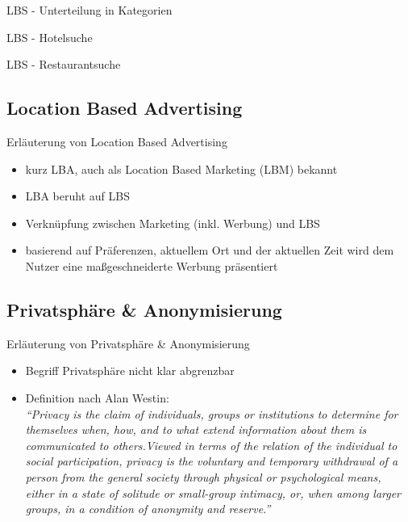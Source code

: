 \begin{frame}{LBS - Unterteilung in Kategorien}
  \begin{center}
  \end{center}
\end{frame}

\begin{frame}{LBS - Hotelsuche}
  \begin{center}
  \end{center}
\end{frame}

\begin{frame}{LBS - Restaurantsuche}
  \begin{center}
  \end{center}
\end{frame}

\subsection{Location Based Advertising}
\begin{frame}{Erläuterung von Location Based Advertising}
\begin{itemize}
  \item kurz LBA, auch als Location Based Marketing (LBM) bekannt
  \item LBA beruht auf LBS
  \item Verknüpfung zwischen Marketing (inkl. Werbung) und LBS
  \item basierend auf Präferenzen, aktuellem Ort und der aktuellen Zeit wird dem Nutzer eine maßgeschneiderte Werbung präsentiert
\end{itemize}
\end{frame}

\subsection{Privatsphäre \& Anonymisierung}
\begin{frame}{Erläuterung von Privatsphäre \& Anonymisierung}
\begin{itemize}
  \item Begriff Privatsphäre nicht klar abgrenzbar
  \item Definition nach Alan Westin: \\ \vspace{.5cm}
  \textit{"`Privacy is the claim of individuals, groups or institutions to determine for themselves when, how, and to what extend information about them is communicated to others.Viewed in terms of the relation of the individual to social participation, privacy is the voluntary and temporary withdrawal of a person from the general society through physical or psychological means, either in a state of solitude or small-group intimacy, or, when among larger groups, in a condition of anonymity and reserve."'}
\end{itemize}
\end{frame}

